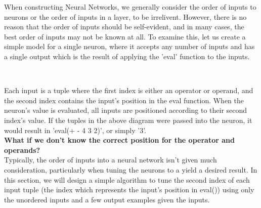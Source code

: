 \documentclass[./Research.tex]{subfiles}
\begin{document}
\def\layersep{2.5cm}

	When constructing Neural Networks, we generally consider the order of inputs to neurons or the order of inputs in a layer, to be irrelivent. However, there is no reason that the order of inputs should be self-evident, and in many cases, the best order of inputs may not be known at all. To examine this, let us create a simple model for a single neuron, where it accepts any number of inputs and has a single output which is the result of applying the 'eval' function to the inputs. \\

\begin{center}
 \\
\end{center}
	
	Each input is a tuple where the first index is either an operator or operand, and the second index contains the input's position in the eval function. When the neuron's value is evaluated, all inputs are positioned according to their second index's value. If the tuples in the above diagram were passed into the neuron, it would result in 'eval(+ - 4 3 2)', or simply '3'. \\
	
\textbf{What if we don't know the correct position for the operator and operands?} \\
	Typically, the order of inputs into a neural network isn't given much consideration, particularly when tuning the neurons to a yield a desired result. In this section, we will design a simple algorithm to tune the second index of each input tuple (the index which represents the input's position in eval()) using only the unordered inputs and a few output examples given the inputs. \\
\end{document}
